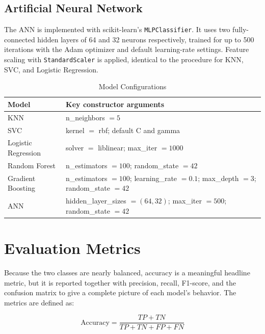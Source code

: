 \documentclass[conference]{IEEEtran}
\begin{document}
\subsection{Artificial Neural Network}

The ANN is implemented with scikit-learn's \texttt{MLPClassifier}. It uses two fully-connected hidden layers of 64 and 32 neurons respectively, trained for up to 500 iterations with the Adam optimizer and default learning-rate settings. Feature scaling with \texttt{StandardScaler} is applied, identical to the procedure for KNN, SVC, and Logistic Regression.

\begin{table}[H]
\centering
\caption{Model Configurations}
\begin{tabular}{|l|p{5.0cm}|}
\hline
\textbf{Model} & \textbf{Key constructor arguments} \\
\hline
KNN & n\_neighbors $= 5$ \\
\hline
SVC & kernel $=$ rbf; default C and gamma \\
\hline
Logistic Regression & solver $=$ liblinear; max\_iter $= 1000$ \\
\hline
Random Forest & n\_estimators $= 100$; random\_state $= 42$ \\
\hline
Gradient Boosting & n\_estimators $= 100$; learning\_rate $= 0.1$; max\_depth $= 3$; random\_state $= 42$ \\
\hline
ANN & hidden\_layer\_sizes $= (64, 32)$; max\_iter $= 500$; random\_state $= 42$ \\
\hline
\end{tabular}
\label{tab:hyper}
\end{table}


\section{Evaluation Metrics}

Because the two classes are nearly balanced, accuracy is a meaningful headline metric, but it is reported together with precision, recall, F1-score, and the confusion matrix to give a complete picture of each model's behavior. The metrics are defined as:

\begin{equation}
\text{Accuracy} = \frac{TP + TN}{TP + TN + FP + FN}
\end{equation}
\end{document}
